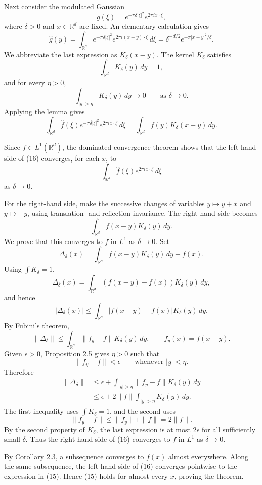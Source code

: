 \documentclass[11pt,openany]{book}
\begin{document}
Next consider the modulated Gaussian
\[
g(\xi)=e^{-\pi\delta|\xi|^2}e^{2\pi i x\cdot\xi},
\]
where $\delta>0$ and $x\in\mathbb{R}^d$ are fixed. An elementary calculation gives
\[
\widehat g(y)
=\int_{\mathbb{R}^d}e^{-\pi\delta|\xi|^2}e^{2\pi i(x-y)\cdot\xi}\,d\xi
=\delta^{-d/2}e^{-\pi|x-y|^2/\delta}.
\]
We abbreviate the last expression as $K_\delta(x-y)$. The kernel $K_\delta$ satisfies
\[
\int_{\mathbb{R}^d}K_\delta(y)\,dy=1,
\]
and for every $\eta>0$,
\[
\int_{|y|>\eta}K_\delta(y)\,dy\to0
\qquad\text{as }\delta\to0.
\]
Applying the lemma gives
\begin{equation}
\int_{\mathbb{R}^d}
\widehat f(\xi)e^{-\pi\delta|\xi|^2}e^{2\pi i x\cdot\xi}\,d\xi
=
\int_{\mathbb{R}^d}f(y)K_\delta(x-y)\,dy.
\tag{16}
\end{equation}

Since $\widehat f\in L^1(\mathbb{R}^d)$, the dominated convergence theorem shows that the left-hand side of (16) converges, for each $x$, to
\[
\int_{\mathbb{R}^d}\widehat f(\xi)e^{2\pi i x\cdot\xi}\,d\xi
\]
as $\delta\to0$.

For the right-hand side, make the successive changes of variables $y\mapsto y+x$ and $y\mapsto-y$, using translation- and reflection-invariance. The right-hand side becomes
\[
\int_{\mathbb{R}^d}f(x-y)K_\delta(y)\,dy.
\]
We prove that this converges to $f$ in $L^1$ as $\delta\to0$. Set
\[
\Delta_\delta(x)
=\int_{\mathbb{R}^d}f(x-y)K_\delta(y)\,dy-f(x).
\]
Using $\int K_\delta=1$,
\[
\Delta_\delta(x)
=\int_{\mathbb{R}^d}(f(x-y)-f(x))K_\delta(y)\,dy,
\]
and hence
\[
|\Delta_\delta(x)|
\leq\int_{\mathbb{R}^d}|f(x-y)-f(x)|K_\delta(y)\,dy.
\]
By Fubini's theorem,
\[
\|\Delta_\delta\|
\leq\int_{\mathbb{R}^d}\|f_y-f\|K_\delta(y)\,dy,
\qquad f_y(x)=f(x-y).
\]
Given $\epsilon>0$, Proposition 2.5 gives $\eta>0$ such that
\[
\|f_y-f\|<\epsilon
\qquad\text{whenever }|y|<\eta.
\]
Therefore
\begin{align*}
\|\Delta_\delta\|
&\leq\epsilon
 +\int_{|y|>\eta}\|f_y-f\|K_\delta(y)\,dy\\
&\leq\epsilon
 +2\|f\|\int_{|y|>\eta}K_\delta(y)\,dy.
\end{align*}
The first inequality uses $\int K_\delta=1$, and the second uses
\[
\|f_y-f\|\leq\|f_y\|+\|f\|=2\|f\|.
\]
By the second property of $K_\delta$, the last expression is at most $2\epsilon$ for all sufficiently small $\delta$. Thus the right-hand side of (16) converges to $f$ in $L^1$ as $\delta\to0$.

By Corollary 2.3, a subsequence converges to $f(x)$ almost everywhere. Along the same subsequence, the left-hand side of (16) converges pointwise to the expression in (15). Hence (15) holds for almost every $x$, proving the theorem.
\end{document}
